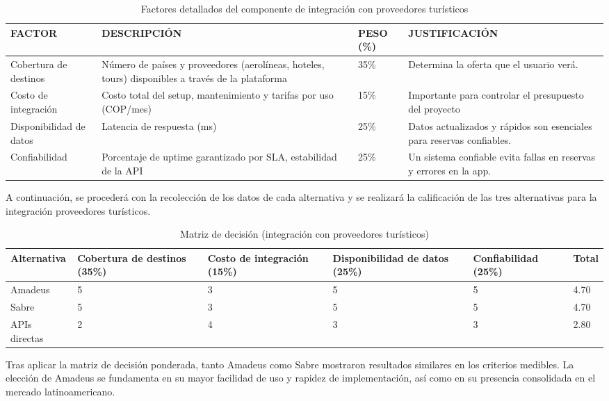 \documentclass[12pt,a4paper]{article}
\begin{document}
\begin{table}[H]
\centering
\begin{tabular}{p{3cm}p{5cm}p{2cm}p{5cm}}
\toprule
\textbf{FACTOR} & \textbf{DESCRIPCIÓN} & \textbf{PESO (\%)} & \textbf{JUSTIFICACIÓN} \\
\midrule
Cobertura de destinos & Número de países y proveedores (aerolíneas, hoteles, tours) disponibles a través de la plataforma & 35\% & Determina la oferta que el usuario verá. \\
\addlinespace
Costo de integración & Costo total del setup, mantenimiento y tarifas por uso (COP/mes) & 15\% & Importante para controlar el presupuesto del proyecto \\
\addlinespace
Disponibilidad de datos & Latencia de respuesta (ms) & 25\% & Datos actualizados y rápidos son esenciales para reservas confiables. \\
\addlinespace
Confiabilidad & Porcentaje de uptime garantizado por SLA, estabilidad de la API & 25\% & Un sistema confiable evita fallas en reservas y errores en la app. \\
\bottomrule
\end{tabular}
\caption{Factores detallados del componente de integración con proveedores turísticos}
\end{table}

A continuación, se procederá con la recolección de los datos de cada alternativa y se realizará la calificación de las tres alternativas para la integración proveedores turísticos.

\begin{table}[H]
\centering
\begin{tabular}{p{2.5cm}p{2cm}p{2cm}p{2cm}p{2cm}p{2cm}}
\toprule
\textbf{Alternativa} & \textbf{Cobertura de destinos (35\%)} & \textbf{Costo de integración (15\%)} & \textbf{Disponibilidad de datos (25\%)} & \textbf{Confiabilidad (25\%)} & \textbf{Total} \\
\midrule
Amadeus & 5 & 3 & 5 & 5 & 4.70 \\
Sabre & 5 & 3 & 5 & 5 & 4.70 \\
APIs directas & 2 & 4 & 3 & 3 & 2.80 \\
\bottomrule
\end{tabular}
\caption{Matriz de decisión (integración con proveedores turísticos)}
\end{table}

Tras aplicar la matriz de decisión ponderada, tanto Amadeus como Sabre mostraron resultados similares en los criterios medibles. La elección de Amadeus se fundamenta en su mayor facilidad de uso y rapidez de implementación, así como en su presencia consolidada en el mercado latinoamericano.
\end{document}
